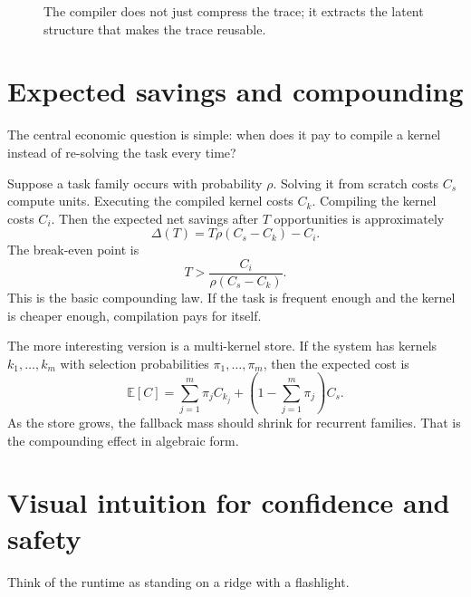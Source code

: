 \documentclass{article}
\begin{document}
\begin{figure}[t]
\centering
{}
\caption{The compiler does not just compress the trace; it extracts the latent structure that makes the trace reusable.}
\end{figure}

\section{Expected savings and compounding}

The central economic question is simple: when does it pay to compile a kernel instead of re-solving the task every time?

Suppose a task family occurs with probability $\rho$. Solving it from scratch costs $C_s$ compute units. Executing the compiled kernel costs $C_k$. Compiling the kernel costs $C_i$. Then the expected net savings after $T$ opportunities is approximately
\[
\Delta(T)=T\rho(C_s-C_k)-C_i.
\]
The break-even point is
\[
T > \frac{C_i}{\rho(C_s-C_k)}.
\]
This is the basic compounding law. If the task is frequent enough and the kernel is cheaper enough, compilation pays for itself.

The more interesting version is a multi-kernel store. If the system has kernels $k_1,\dots,k_m$ with selection probabilities $\pi_1,\dots,\pi_m$, then the expected cost is
\[
\mathbb{E}[C]=\sum_{j=1}^m \pi_j C_{k_j} + \left(1-\sum_{j=1}^m \pi_j\right) C_s.
\]
As the store grows, the fallback mass should shrink for recurrent families. That is the compounding effect in algebraic form.

\section{Visual intuition for confidence and safety}

Think of the runtime as standing on a ridge with a flashlight.
\end{document}
